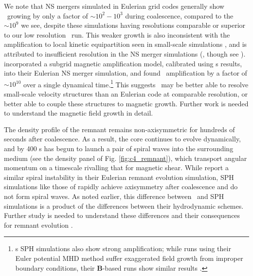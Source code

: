 
We note that NS mergers simulated in Eulerian grid codes generally show \EB\ growing by only a factor of $\sim10^2-10^3$ during coalescence, compared to the $\sim10^9$ we see, despite these simulations having resolutions comparable or superior to our low resolution \arepo\ run.  This weaker growth is also inconsistent with the amplification to local kinetic equipartition seen in small-scale simulations \citep{oberam10, zrakm13}, and is attributed to insufficient resolution in the NS merger simulations (\citealt{kiuc+14,giac+15}, though see \citealt{dionar15}).  \cite{giac+15} incorporated a subgrid magnetic amplification model, calibrated using \cite{zrakm13}s results, into their Eulerian NS merger simulation, and found \EB\ amplification by a factor of $\sim10^{10}$ over a single dynamical time.\footnote{\cite{pricr06}s SPH simulations also show strong amplification; while runs using their Euler potential MHD method suffer exaggerated field growth from improper boundary conditions, their $\boldsymbol{B}$-based runs show similar results \citep{pric12}.}  This suggests \arepo\ may be better able to resolve small-scale velocity structures than an Eulerian code at comparable resolution, or better able to couple these structures to magnetic growth.  Further work is needed to understand the magnetic field growth in detail.

The density profile of the remnant remains non-axisymmetric for hundreds of seconds after coalescence.  As a result, the core continues to evolve dynamically, and by 400 s has begun to launch a pair of spiral waves into the surrounding medium (see the density panel of Fig. \ref{fig:c4_remnant}), which transport angular momentum on a timescale rivalling that for magnetic shear.  While \cite{kash+15} report a similar spiral instability in their Eulerian remnant evolution simulation, SPH simulations like those of \citeal{zhu+13} rapidly achieve axisymmetry after coalescence and do not form spiral waves.  As noted earlier, this difference between \arepo\ and SPH simulations is a product of the differences between their hydrodynamic schemes.  Further study is needed to understand these differences and their consequences for remnant evolution \Zhuprep.


